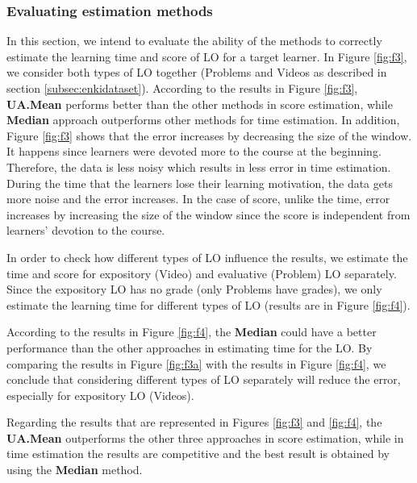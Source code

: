 \documentclass{sig-alternate}
\begin{document}
\subsubsection{Evaluating estimation methods}
\label{subsubsec:evaluatingestimationmethods}
\noindent In this section, we intend to evaluate the ability of the methods to correctly estimate the learning time and score of LO for a target learner. In Figure \ref{fig:f3}, we consider both types of LO together (Problems and Videos as described in section \ref{subsec:enkidataset}). According to the results in Figure \ref{fig:f3}, \textbf{UA.Mean} performs better than the other methods in score estimation, while \textbf{Median} approach outperforms other methods for time estimation. In addition, Figure \ref{fig:f3} shows that the error increases by decreasing the size of the window. It happens since learners were devoted more to the course at the beginning. Therefore, the data is less noisy which results in less error in time estimation. During the time that the learners lose their learning motivation, the data gets more noise and the error increases. In the case of score, unlike the time, error increases by increasing the size of the window since the score is independent from learners’ devotion to the course.

In order to check how different types of LO influence the results, we estimate the time and score for expository (Video) and evaluative (Problem) LO separately. Since the expository LO has no grade (only Problems have grades), we only estimate the learning time for different types of LO (results are in Figure \ref{fig:f4}).

According to the results in Figure \ref{fig:f4}, the \textbf{Median} could have a better performance than the other approaches in estimating time for the LO. By comparing the results in Figure \ref{fig:f3a} with the results in Figure \ref{fig:f4}, we conclude that considering different types of LO separately will reduce the error, especially for expository LO (Videos).

Regarding the results that are represented in Figures \ref{fig:f3} and \ref{fig:f4}, the \textbf{UA.Mean} outperforms the other three approaches in score estimation, while in time estimation the results are competitive and the best result is obtained by using the \textbf{Median} method.
\end{document}
